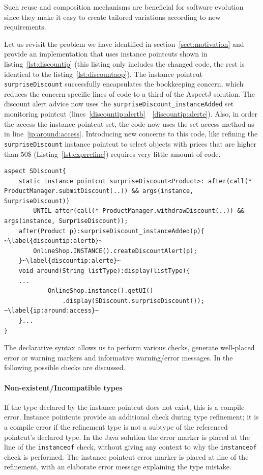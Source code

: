 \documentclass{acm_proc_article-sp}
\newcommand{\lstinln}[1]{\lstinline~#1~}
\begin{document}
Such reuse and composition mechanisms are beneficial for software evolution since they make it easy to create tailored variations according to new requirements.

Let us revisit the problem we have identified in section~\ref{sect:motivation} and provide an implementation that uses instance pointcuts shown in listing~\ref{lst:discountip} (this listing only includes the changed code, the rest is identical to the listing~\ref{lst:discountaop}). The instance pointcut \lstinln{surpriseDiscount} successfully encapsulates the bookkeeping concern, which reduces the concern specific lines of code to a third of the AspectJ solution. The discount alert advice now uses the \lstinln{surpriseDiscount_instanceAdded} set monitoring pointcut (lines~\ref{discountip:alertb}~\textendash~\ref{discountip:alerte}). Also, in order the access the instance pointcut set, the code now uses the set access method as in line~\ref{ip:around:access}. Introducing new concerns to this code, like refining the \lstinln{surpriseDiscount} instance pointcut to select objects with prices that are higher than 50\$ (Listing~\ref{lst:exprrefine}) requires very little amount of code.   

\begin{lstlisting}[float=h, moreemph=instance, caption={The instance pointcut implementation of the discount alert concern}, label={lst:discountip}]
aspect SDiscount{
	static instance pointcut surpriseDiscount<Product>: after(call(* ProductManager.submitDiscount(..)) && args(instance, SurpriseDiscount)) 
		UNTIL after(call(* ProductManager.withdrawDiscount(..)) && args(instance, SurpriseDiscount));
	after(Product p):surpriseDiscount_instanceAdded(p){ ~\label{discountip:alertb}~
		OnlineShop.INSTANCE().createDiscountAlert(p);
	}~\label{discountip:alerte}~
	void around(String listType):display(listType){
	...
			OnlineShop.instance().getUI()
				.display(SDiscount.surpriseDiscount()); ~\label{ip:around:access}~
	}... 
}
\end{lstlisting}

The declarative syntax allows us to perform various checks, generate well-placed error or warning markers and informative warning/error messages. In the following possible checks are discussed. 

\paragraph*{Non-existent/Incompatible types} If the type declared by the instance pointcut does not exist, this is a compile error. Instance pointcuts provide an additional check during type refinement; it is a compile error if the refinement type is not a subtype of the referenced pointcut's declared type. In the Java solution the error marker is placed at the line of the \lstinln{instanceof} check, without giving any context to why the \lstinln{instanceof} check is performed. The instance pointcut error marker is placed at line of the refinement, with an elaborate error message explaining the type mistake. 
\end{document}

